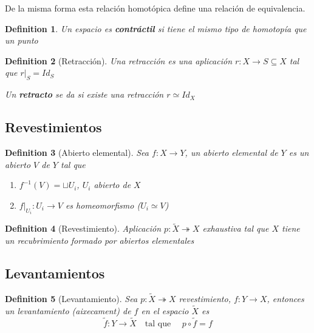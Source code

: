 \documentclass{myclass}
\newtheorem*{definition}{Definition}
\begin{document}
De la misma forma esta relación homotópica define una relación de equivalencia.

\begin{definition}
Un espacio es \textbf{contráctil} si tiene el mismo tipo de homotopía que un punto 
\end{definition}

\begin{definition}[Retracción]
  Una retracción es una aplicación $r:X \to S \subseteq X$ tal que $r|_S = Id_S$

  Un \textbf{retracto} se da si existe una retracción $r\simeq Id_X$
\end{definition}

\subsection{Revestimientos}
\begin{definition}[Abierto elemental] Sea $f:X \to  Y$, un abierto elemental de $Y$ es un abierto $V$ de  $Y$ tal que
  \begin{enumerate}[topsep=-6pt, itemsep=0pt]
    \item $f^{-1}(V) = \sqcup U_i$, $U_i$ abierto de  $X$
	\item  $f|_{U_i}: U_i \to V$ es homeomorfismo ($U_i \simeq V$)
  \end{enumerate}
\end{definition}



\begin{definition}[Revestimiento] Aplicación $p:\tilde{X} \twoheadrightarrow X$ exhaustiva tal que $X$ tiene un recubrimiento formado por abiertos elementales
\end{definition}

\subsection{Levantamientos}

  \begin{minipage}{0.8\textwidth}
\begin{definition}[Levantamiento] Sea $p: \tilde{X} \twoheadrightarrow  X$ revestimiento, $f: Y \to X$, entonces un levantamiento (aixecament) de $f$ en el espacio  $\tilde{X}$ es
  \[
  \tilde{f}: Y \to \tilde{X} \quad \text{tal que } \quad p\circ \tilde{f} = f
  \] 
\end{definition}
  \end{minipage}
  \begin{minipage}{0.2\textwidth}
  \end{minipage}
\end{document}

